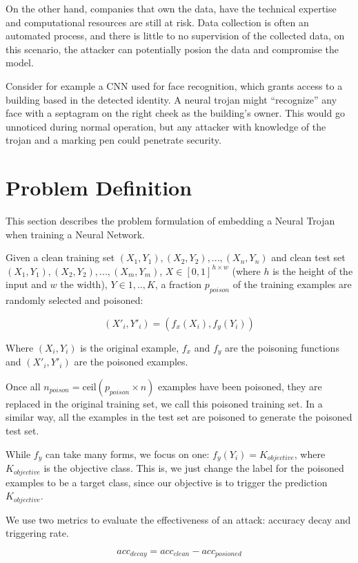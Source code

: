 \documentclass[letterpaper, 10 pt, conference]{ieeeconf}  %
\begin{document}
On the other hand, companies that own the data, have the technical expertise and computational resources are still at risk. Data collection is often an automated process, and there is little to no supervision of the collected data, on this scenario, the attacker can potentially posion the data and compromise the model.

Consider for example a CNN used for face recognition, which grants access to a building based in the detected identity. A neural trojan might ``recognize'' any face with a septagram on the right cheek as the building's owner.  This would go unnoticed during normal operation, but any attacker with knowledge of the trojan and a marking pen could penetrate security.


\section{Problem Definition}

This section describes the problem formulation of embedding a Neural Trojan
when training a Neural Network.

Given a clean training set $(X_1, Y_1), (X_2, Y_2),..., (X_n, Y_n)$ and clean test set $(X_1, Y_1), (X_2, Y_2),..., (X_m, Y_m)$, $X \in [0, 1]^{h \times w}$ (where $h$ is the height of the input and $w$ the width), $Y \in 1,..,K$, a fraction $p_{poison}$ of the training examples are randomly selected and poisoned:

$$(X'_i, Y'_i) = (f_x(X_i), f_y(Y_i))$$

Where $(X_i, Y_i)$ is the original example, $f_x$ and $f_y$ are the poisoning functions and $(X'_i, Y'_i)$ are the poisoned examples.

Once all $n_{poison} = \text{ceil}(p_{poison} \times n)$ examples have been poisoned, they are replaced in the original training set, we call this poisoned training set. In a similar way, all the examples in the test set are poisoned to generate the poisoned test set.

While $f_y$ can take many forms, we focus on one: $f_y(Y_i) = K_{objective}$, where $K_{objective}$ is the objective class. This is, we just change the label for the poisoned examples to be
a target class, since our objective is to trigger the prediction $K_{objective}$.

We use two metrics to evaluate the effectiveness of an attack: accuracy decay
and triggering rate.

$$acc_{decay} = acc_{clean} - acc_{posioned}$$
\end{document}
